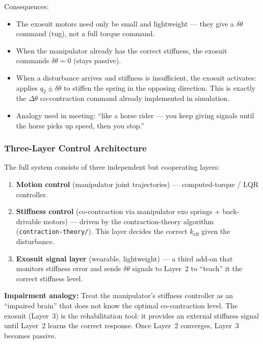 \documentclass[11pt, a4paper]{article}
\begin{document}
\noindent
Consequences:
\begin{itemize}[nosep]
  \item The exosuit motors need only be small and lightweight --- they give
    a $\delta\theta$ command (tug), not a full torque command.
  \item When the manipulator already has the correct stiffness, the exosuit
    commands $\delta\theta = 0$ (stays passive).
  \item When a disturbance arrives and stiffness is insufficient, the exosuit
    activates: applies $q_2 \pm \delta\theta$ to stiffen the spring in the
    opposing direction.  This is exactly the $\Delta\theta$ co-contraction
    command already implemented in simulation.
  \item Analogy used in meeting: ``like a horse rider --- you keep giving
    signals until the horse picks up speed, then you stop.''
\end{itemize}

\subsubsection*{Three-Layer Control Architecture}

The full system consists of three independent but cooperating layers:

\begin{enumerate}
  \item \textbf{Motion control} (manipulator joint trajectories) ---
    computed-torque / LQR controller.
  \item \textbf{Stiffness control} (co-contraction via manipulator exo
    springs + back-drivable motors) --- driven by the contraction-theory
    algorithm (\texttt{contraction-theory/}).  This layer decides the
    correct $k_{\text{eff}}$ given the disturbance.
  \item \textbf{Exosuit signal layer} (wearable, lightweight) --- a third
    add-on that monitors stiffness error and sends $\delta\theta$ signals to
    Layer~2 to ``teach'' it the correct stiffness level.
\end{enumerate}

\noindent
\textbf{Impairment analogy:} Treat the manipulator's stiffness controller
as an ``impaired brain'' that does not know the optimal co-contraction level.
The exosuit (Layer~3) is the rehabilitation tool: it provides an external
stiffness signal until Layer~2 learns the correct response.  Once Layer~2
converges, Layer~3 becomes passive.
\end{document}
